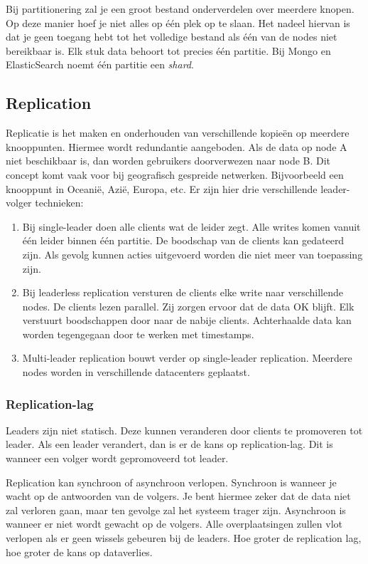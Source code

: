 \documentclass[a4paper,10pt,twoside]{report}
\begin{document}
Bij partitionering zal je een groot bestand onderverdelen over meerdere knopen. Op deze manier hoef je niet alles op één plek op te slaan. Het nadeel hiervan is dat je geen toegang hebt tot het volledige bestand als één van de nodes niet bereikbaar is. Elk stuk data behoort tot precies één partitie. Bij Mongo en ElasticSearch noemt één partitie een \textit{shard}.

\subsection{Replication}

Replicatie is het maken en onderhouden van verschillende kopieën op meerdere knooppunten. Hiermee wordt redundantie aangeboden. Als de data op node A niet beschikbaar is, dan worden gebruikers doorverwezen naar node B. Dit concept komt vaak voor bij geografisch gespreide netwerken. Bijvoorbeeld een knooppunt in Oceanië, Azië, Europa, etc. Er zijn hier drie verschillende leader-volger technieken: 

\begin{enumerate}
	\item  Bij single-leader doen alle clients wat de leider zegt. Alle writes komen vanuit één leider binnen één partitie. De boodschap van de clients kan gedateerd zijn. Als gevolg kunnen acties uitgevoerd worden die niet meer van toepassing zijn. 
	\item Bij leaderless replication versturen de clients elke write naar verschillende nodes. De clients lezen parallel.  Zij zorgen ervoor dat de data OK blijft. Elk verstuurt boodschappen door naar de nabije clients. Achterhaalde data kan worden tegengegaan door te werken met timestamps.
	\item  Multi-leader replication bouwt verder op single-leader replication. Meerdere nodes worden in verschillende datacenters geplaatst.
\end{enumerate}

\subsubsection{Replication-lag}

Leaders zijn niet statisch. Deze kunnen veranderen door clients te promoveren tot leader. Als een leader verandert, dan is er de kans op replication-lag. Dit is wanneer een volger wordt gepromoveerd tot leader.

Replication kan synchroon of asynchroon verlopen. Synchroon is wanneer je wacht op de antwoorden van de volgers. Je bent hiermee zeker dat de data niet zal verloren gaan, maar ten gevolge zal het systeem trager zijn. Asynchroon is wanneer er niet wordt gewacht op de volgers. Alle overplaatsingen zullen vlot verlopen als er geen wissels gebeuren bij de leaders. Hoe groter de replication lag, hoe groter de kans op dataverlies.
 
\end{document}
